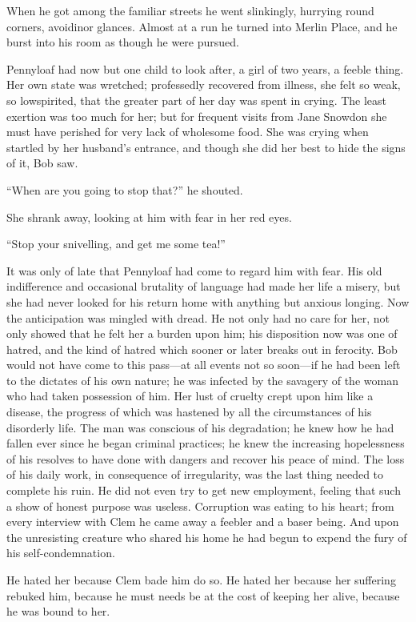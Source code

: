 When he got among the familiar streets he went slinkingly, hurrying
round corners, avoidinor glances. Almost at a run he turned into Merlin
Place, and he burst into his room as though he were pursued.

Pennyloaf had now but one child to look after, a girl of two years, a
feeble thing. Her own state was wretched; professedly recovered from
illness, she felt so weak, so lowspirited, that the greater part of her
day was spent in crying. The least exertion was too much for her; but
for frequent visits from Jane Snowdon she must have perished for very
lack of wholesome food. She was crying when startled by her husband's
entrance, and though she did her best to hide the signs of it, Bob saw.

``When are you going to stop that?'' he shouted.

She shrank away, looking at him with fear in her red eyes.

{}``Stop your snivelling, and get me some tea!''

It was only of late that Pennyloaf had come to regard him with fear. His
old indifference and occasional brutality of language had made her life
a misery, but she had never looked for his return home with anything but
anxious longing. Now the anticipation was mingled with dread. He not
only had no care for her, not only showed that he felt her a burden upon
him; his disposition now was one of hatred, and the kind of hatred which
sooner or later breaks out in ferocity. Bob would not have come to this
pass---at all events not so soon---if he had been left to the dictates
of his own nature; he was infected by the savagery of the woman who had
taken possession of him. Her lust of cruelty crept upon him like a
disease, the progress of which was hastened by all the circumstances of
his disorderly life. The man was conscious of his degradation; he knew
how he had fallen ever since he began criminal practices; he knew the
increasing hopelessness of his resolves to have done with dangers and
recover his peace of mind. The loss of his daily work, in consequence of
irregularity, was the last thing needed to complete {}his ruin. He did
not even try to get new employment, feeling that such a show of honest
purpose was useless. Corruption was eating to his heart; from every
interview with Clem he came away a feebler and a baser being. And upon
the unresisting creature who shared his home he had begun to expend the
fury of his self-condemnation.

He hated her because Clem bade him do so. He hated her because her
suffering rebuked him, because he must needs be at the cost of keeping
her alive, because he was bound to her.

